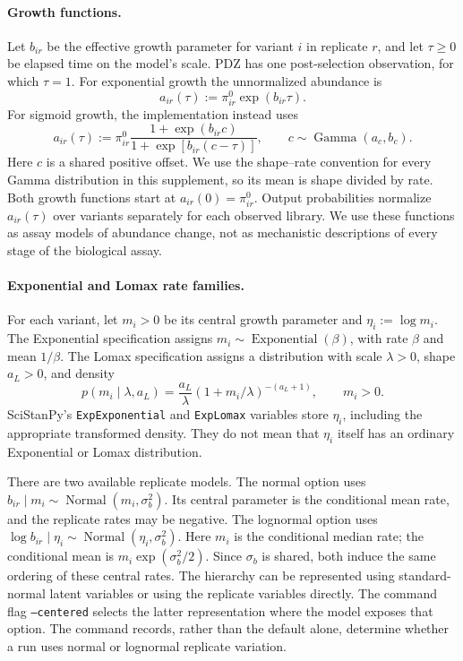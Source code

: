 \paragraph{Growth functions.}
Let $b_{ir}$ be the effective growth parameter for variant $i$ in replicate
$r$, and let $\tau\geq0$ be elapsed time on the model's scale. PDZ has one
post-selection observation, for which $\tau=1$. For exponential growth the
unnormalized abundance is
\[
a_{ir}(\tau):=\pi_{ir}^0\exp(b_{ir}\tau).
\]
For sigmoid growth, the implementation instead uses
\[
a_{ir}(\tau):=\pi_{ir}^0
\frac{1+\exp(b_{ir}c)}{1+\exp[b_{ir}(c-\tau)]},
\qquad c\sim\operatorname{Gamma}(a_c,b_c).
\]
Here $c$ is a shared positive offset. We use the shape--rate convention
for every Gamma distribution in this supplement, so its mean is shape
divided by rate. Both growth functions start at $a_{ir}(0)=\pi_{ir}^0$.
Output probabilities normalize $a_{ir}(\tau)$ over variants separately
for each observed library. We use these functions as assay models of abundance
change, not as mechanistic descriptions of every stage of the biological assay.

\paragraph{Exponential and Lomax rate families.}
For each variant, let $m_i>0$ be its central growth parameter and
$\eta_i:=\log m_i$. The Exponential specification assigns
$m_i\sim\operatorname{Exponential}(\beta)$, with rate $\beta$ and mean
$1/\beta$. The Lomax specification assigns a distribution with scale
$\lambda>0$, shape $a_L>0$, and density
\[
p(m_i\mid\lambda,a_L)=\frac{a_L}{\lambda}
(1+m_i/\lambda)^{-(a_L+1)},\qquad m_i>0.
\]
SciStanPy's \texttt{ExpExponential} and \texttt{ExpLomax} variables store
$\eta_i$, including the appropriate transformed density. They do not mean
that $\eta_i$ itself has an ordinary Exponential or Lomax distribution.

There are two available replicate models. The normal option uses
$b_{ir}\mid m_i\sim\operatorname{Normal}(m_i,\sigma_b^2)$. Its central
parameter is the conditional mean rate, and the replicate rates may be
negative. The lognormal option uses
$\log b_{ir}\mid\eta_i\sim\operatorname{Normal}(\eta_i,\sigma_b^2)$.
Here $m_i$ is the conditional median rate; the conditional mean is
$m_i\exp(\sigma_b^2/2)$. Since $\sigma_b$ is shared, both induce the same
ordering of these central rates. The hierarchy can be represented using
standard-normal latent variables or using the replicate variables directly.
The command flag \texttt{--centered} selects the latter representation where
the model exposes that option. The command records, rather than the default
alone, determine whether a run uses normal or lognormal replicate variation.

